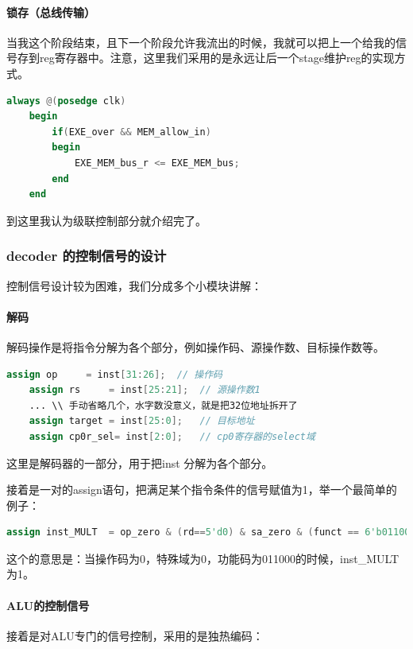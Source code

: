 \documentclass[a4paper]{article}
\begin{document}
\paragraph{锁存（总线传输）}

当我这个阶段结束，且下一个阶段允许我流出的时候，我就可以把上一个给我的信号存到reg寄存器中。注意，这里我们采用的是永远让后一个stage维护reg的实现方式。

\begin{lstlisting}[language=Verilog]
    always @(posedge clk)
    begin
        if(EXE_over && MEM_allow_in)
        begin
            EXE_MEM_bus_r <= EXE_MEM_bus;
        end
    end
\end{lstlisting}


到这里我认为级联控制部分就介绍完了。

\subsubsection{decoder 的控制信号的设计}

控制信号设计较为困难，我们分成多个小模块讲解：

\paragraph{解码} 解码操作是将指令分解为各个部分，例如操作码、源操作数、目标操作数等。

\begin{lstlisting}[language=Verilog]
    assign op     = inst[31:26];  // 操作码
    assign rs     = inst[25:21];  // 源操作数1
    ... \\ 手动省略几个，水字数没意义，就是把32位地址拆开了
    assign target = inst[25:0];   // 目标地址
    assign cp0r_sel= inst[2:0];   // cp0寄存器的select域
\end{lstlisting}

这里是解码器的一部分，用于把inst 分解为各个部分。

接着是一对的assign语句，把满足某个指令条件的信号赋值为1，举一个最简单的例子：

\begin{lstlisting}[language=Verilog]
    assign inst_MULT  = op_zero & (rd==5'd0) & sa_zero & (funct == 6'b011000);             //乘法
\end{lstlisting}

这个的意思是：当操作码为0，特殊域为0，功能码为011000的时候，inst\_MULT为1。


\paragraph{ALU的控制信号}
接着是对ALU专门的信号控制，采用的是独热编码：
\end{document}
